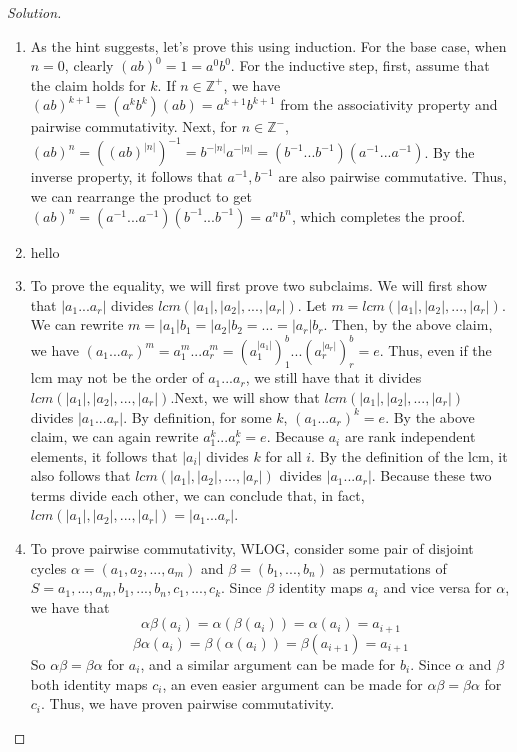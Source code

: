 \documentclass[11 pt]{article}
\theoremstyle{definition}
\theoremstyle{remark}
\newenvironment{solution}
  {\renewcommand\qedsymbol{$\blacksquare$}\begin{proof}[Solution]}
  {\end{proof}}
\begin{document}
\begin{solution}
\begin{enumerate}
\item As the hint suggests, let's prove this using induction. For the base case, when $n = 0$, clearly $(ab)^0 = 1 = a^0b^0$. For the inductive step, first, assume that the claim holds for $k$. If $n \in \mathbb{Z}^+$, we have $(ab)^{k+1}=(a^kb^k)(ab)=a^{k+1}b^{k+1}$ from the associativity property and pairwise commutativity. Next, for $n \in \mathbb{Z}^-$, $(ab)^n = ((ab)^{|n|})^{-1} = b^{-|n|}a^{-|n|} = (b^{-1}...b^{-1})(a^{-1}...a^{-1})$. By the inverse property, it follows that $a^{-1},b^{-1}$ are also pairwise commutative. Thus, we can rearrange the product to get $(ab)^n = (a^{-1}...a^{-1})(b^{-1}...b^{-1}) = a^nb^n$, which completes the proof.

\item hello

\item To prove the equality, we will first prove two subclaims. We will first show that $|a_1...a_r|$ divides $lcm(|a_1|,|a_2|,...,|a_r|)$. Let $m = lcm(|a_1|,|a_2|,...,|a_r|)$. We can rewrite $m = |a_1|b_1=|a_2|b_2 = ... = |a_r|b_r$. Then, by the above claim, we have $(a_1...a_r)^m = a_1^m...a_r^m=(a_1^{|a_1|})^b_1...(a_r^{|a_r|})^b_r=e$. Thus, even if the lcm may not be the order of $a_1...a_r$, we still have that it divides $lcm(|a_1|,|a_2|,...,|a_r|)$.Next, we will show that $lcm(|a_1|,|a_2|,...,|a_r|)$ divides $|a_1...a_r|$. By definition, for some $k$, $(a_1...a_r)^k=e$. By the above claim, we can again rewrite $a_1^k...a_r^k=e$. Because $a_i$ are rank independent elements, it follows that $|a_i|$ divides $k$ for all $i$. By the definition of the lcm, it also follows that $lcm(|a_1|,|a_2|,...,|a_r|)$ divides $|a_1...a_r|$. Because these two terms divide each other, we can conclude that, in fact, $lcm(|a_1|,|a_2|,...,|a_r|) = |a_1...a_r|$.

\item 

To prove pairwise commutativity, WLOG, consider some pair of disjoint cycles $\alpha = (a_1, a_2,...,a_m)$ and $\beta = (b_1,...,b_n)$ as permutations of $S = {a_1,...,a_m,b_1,...,b_n,c_1,...,c_k}$. Since $\beta$ identity maps $a_i$ and vice versa for $\alpha$, we have that 
$$\alpha\beta(a_i) = \alpha(\beta(a_i)) = \alpha(a_i) = a_{i+1}$$
$$\beta\alpha(a_i) = \beta(\alpha(a_i)) = \beta(a_{i+1}) = a_{i+1}$$
So $\alpha\beta = \beta\alpha$ for $a_i$, and a similar argument can be made for $b_i$. Since $\alpha$ and $\beta$ both identity maps $c_i$, an even easier argument can be made for $\alpha\beta = \beta\alpha$ for $c_i$. Thus, we have proven pairwise commutativity.


\end{enumerate}
\end{solution}
\end{document}
